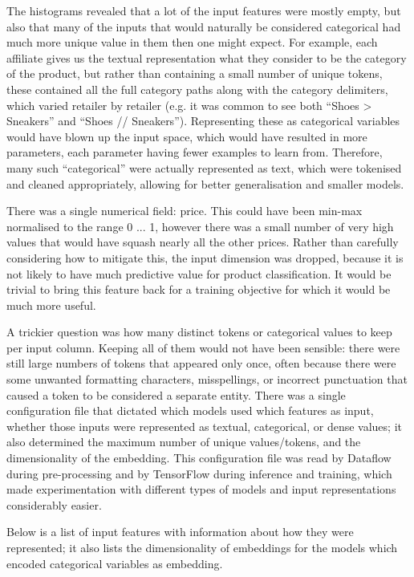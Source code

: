 The histograms revealed that a lot of the input features were mostly empty, but also that many of the inputs that would naturally be considered categorical  had much more unique value in them then one might expect.
For example, each affiliate gives us the textual representation what they consider to be the category of the product,  but  rather than containing a small number of unique tokens, these contained all the full category paths along with the category delimiters, which  varied retailer by retailer (e.g.  it was common to see both ``Shoes > Sneakers'' and ``Shoes // Sneakers'').
Representing these as categorical variables would have blown up the input space, which would have  resulted in more parameters, each parameter having fewer examples to learn from.
Therefore, many such ``categorical''  were actually represented as text, which were tokenised and cleaned appropriately, allowing for better generalisation and smaller models.

There was a single numerical field: price.
This could have been min-max normalised to the range 0 ... 1, however there  was a small number of very high values that would have squash nearly all the other  prices.
Rather than  carefully considering  how to mitigate this,  the input dimension was dropped, because it is not likely to have much predictive value for product classification.
It would be trivial to bring this feature back for a training objective for which it would be much more useful.

A trickier question was how many distinct tokens or categorical values to keep per input column.
Keeping all of them would not have been sensible: there were still large numbers of tokens that appeared only once, often because there were some unwanted formatting characters, misspellings, or incorrect punctuation that caused a token to be considered a separate entity.
There was a single configuration file that dictated which models used which features as input, whether those inputs were represented as textual, categorical, or dense values;  it also determined  the maximum number of unique values/tokens,  and the dimensionality of the embedding.
This configuration file was read by Dataflow during pre-processing  and by TensorFlow during  inference and training, which made experimentation with  different types of models and input representations considerably easier.

Below is a list of input features with information about how they were represented; it also lists the dimensionality of embeddings  for the models which  encoded categorical variables as embedding.

